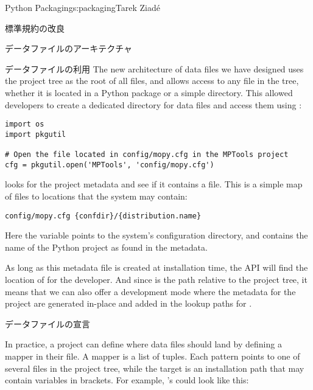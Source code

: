 \begin{aosachapter}{Python Packaging}{s:packaging}{Tarek Ziad\'{e}}
\begin{aosasect1}{標準規約の改良}
\begin{aosasect2}{データファイルのアーキテクチャ}
\begin{aosasect3}{データファイルの利用}
The new architecture of data files we have designed
uses the project tree as the root
of all files, and allows access to any file in the tree, whether it is
located in a Python package or a simple directory.  This allowed
developers to create a dedicated directory for data files and access
them using :

\begin{verbatim}
import os
import pkgutil

# Open the file located in config/mopy.cfg in the MPTools project
cfg = pkgutil.open('MPTools', 'config/mopy.cfg')
\end{verbatim}

\noindent {} looks for the project metadata and see if it
contains a  file. This is a simple map of files to
locations that the system may contain:

\begin{verbatim}
config/mopy.cfg {confdir}/{distribution.name}
\end{verbatim}

\noindent Here the  variable points to the
system's configuration directory, and 
contains the name of the Python project as found in the metadata.


As long as this  metadata file is created at
installation time, the API will find the location of 
for the developer.  And since  is the path
relative to the project tree, it means that we can also offer a
development mode where the metadata for the project are generated
in-place and added in the lookup paths for .

\end{aosasect3}

\begin{aosasect3}{データファイルの宣言}

In practice, a project can define where data files should land by
defining a mapper in their  file.  A mapper is a
list of  tuples. Each pattern
points to one of several files in the project tree, while the target
is an installation path that may contain variables in brackets.  For
example, 's  could look like this:


\end{aosasect3}
\end{aosasect2}
\end{aosasect1}
\end{aosachapter}
